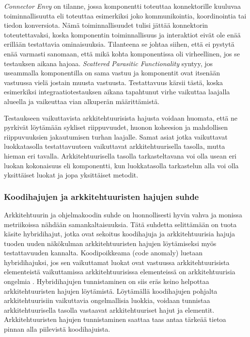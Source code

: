 \documentclass[finnish]{tktltiki2}
\numberwithin{table}{section}
\theoremstyle{definition}
\theoremstyle{remark}
\begin{document}
\textit{Connector Envy} on tilanne, jossa komponentti toteuttaa konnektorille kuuluvaa toiminnallisuutta eli toteuttaa esimerkiksi joko kommunikointia, koordinointia tai tiedon konversiota. Nämä toiminnallisuudet tulisi jättää konnektorin toteutettavaksi, koska komponentin toiminnallisuus ja interaktiot eivät ole enää erillään testattavia ominaisuuksia. Tilanteena se johtaa siihen, että ei pystytä enää varmasti sanomaan, että mikä kohta komponentissa oli virheellinen, jos se testauksen aikana hajoaa. \textit{Scattered Parasitic Functionality} syntyy, jos useammalla komponentilla on sama vastuu ja komponentit ovat itsenään vastuussa vielä jostain muusta vastuusta. Testattavuus kärsii tästä, koska esimerkiksi integraatiotestauksen aikana tapahtunut virhe vaikuttaa laajalla alueella ja vaikeuttaa vian alkuperän määrittämistä. 

\newpage
Testaukseen vaikuttavista arkkitehtuurisista hajusta voidaan huomata, että ne pyrkivät löytämään sykliset riippuvuudet, huonon koheesion ja mahdollisen riippuvuuksien jakautumisen turhan laajalle. Samat asiat jotka vaikuttavat luokkatasolla testattavuuteen vaikuttavat arkkitehtuurisella tasolla, mutta hieman eri tavalla. Arkkitehtuurisella tasolla tarkasteltavana voi olla usean eri luokan kokonaisuus eli komponentti, kun luokkatasolla tarkastelun alla voi olla yksittäiset luokat ja jopa yksittäiset metodit.


\subsubsection{Koodihajujen ja arkkitehtuuristen hajujen suhde}

Arkkitehtuurin ja ohjelmakoodin suhde on luonnollisesti hyvin vahva ja monissa metriikoissa nähdään samankaltaisuuksia. Tätä suhdetta selittämään on tuota käsite hybridihajut, jotka ovat sekoitus koodihajuja ja arkkitehtuurisia hajuja tuoden uuden näkökulman arkkitehtuuristen hajujen löytämiseksi myös testattavuuden kannalta. Koodipoikkeama (code anomaly) luetaan hybridihajuksi, jos sen vaikuttamat luokat ovat vastuussa arkkitehtuurisista elementeistä vaikuttamissa arkkitehtuurisissa elementeissä on arkkitehtuurisia ongelmia \citep{vale_bad_2014}. Hybridihajujen tunnistaminen on siis eräs keino helpottaa arkkitehtuuristen hajujen löytämistä. Löytämällä koodihajujen pohjalta arkkitehtuurisiin vaikuttavia ongelmallisia luokkia, voidaan tunnistaa arkkitehtuurisella tasolla vastaavat arkkitehtuuriset hajut ja elementit. Arkkitehtuuristen hajujen tunnistaminen saattaa taas antaa tärkeää tietoa pinnan alla piilevistä koodihajuista.
\end{document}
